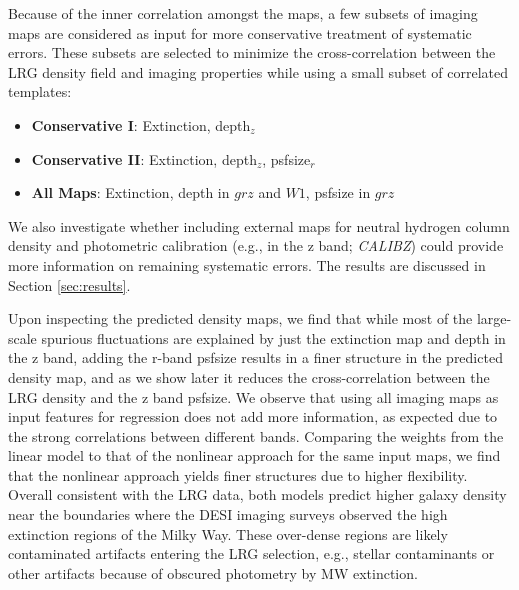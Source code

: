 Because of the inner correlation amongst the maps, a few subsets of imaging maps are considered as input for more conservative treatment of systematic errors. These subsets are selected to minimize the cross-correlation between the LRG density field and imaging properties while using a small subset of correlated templates:
\begin{itemize}
\item \textbf{Conservative I}: Extinction, depth$_{z}$
\item \textbf{Conservative II}: Extinction, depth$_{z}$, psfsize$_{r}$
\item \textbf{All Maps}: Extinction, depth in $grz$ and $W1$, psfsize in $grz$
\end{itemize}
We also investigate whether including external maps for neutral hydrogen column density \citep{2016A&A...594A.116H} and photometric calibration (e.g., in the z band; \textit{CALIBZ}) could provide more information on remaining systematic errors. The results are discussed in Section \ref{sec:results}.


Upon inspecting the predicted density maps, we find that while most of the large-scale spurious fluctuations are explained by just the extinction map and depth in the z band, adding the r-band psfsize results in a finer structure in the predicted density map, and as we show later it reduces the cross-correlation between the LRG density and the z band psfsize. We observe that using all imaging maps as input features for regression does not add more information, as expected due to the strong correlations between different bands. Comparing the weights from the linear model to that of the nonlinear approach for the same input maps, we find that the nonlinear approach yields finer structures due to higher flexibility. Overall consistent with the LRG data, both models predict higher galaxy density near the boundaries where the DESI imaging surveys observed the high extinction regions of the Milky Way. These over-dense regions are likely contaminated artifacts entering the LRG selection, e.g., stellar contaminants or other artifacts because of obscured photometry by MW extinction.

